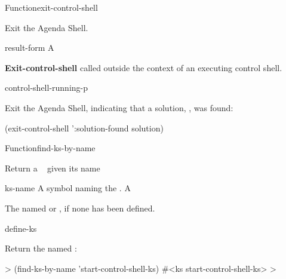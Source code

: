\documentclass[10pt,twoside,english,pdftex]{article}
\begin{document}
\begin{functiondoc}{Function}{exit-control-shell}%
  {}
%
%
%
%

\fnsyntax

\fnpurpose Exit the Agenda Shell.

\fnpackage {}

\fnmodule {}

\fnargs
\begin{args}{result-form}
 A 
\end{args}

\fnerrors \textbf{Exit-control-shell} called outside the context of an
executing control shell.

\begin{alsos}{control-shell-running-p}
\end{alsos}

\fnexample Exit the Agenda Shell, indicating that a solution, 
, was found:
%
\W\supp
\begin{example}
  (exit-control-shell ':solution-found solution)
\end{example}

\end{functiondoc}

 
\begin{functiondoc}{Function}{find-ks-by-name}{ 
    }
%

\fnsyntax

\fnpurpose Return a ~  given its name

\fnpackage {}

\fnmodule {}

\fnargs
\begin{args}{ks-name}
\arg[ks-name] A symbol naming the .
\arg[ks] A 
\end{args}

\fnreturns The   named 
or \nil, if none has been defined.

\begin{alsos}{define-ks}
\also[define-ks]
\also[ks]
\end{alsos}

\fnexample Return the  named :
%
\W\supp
\begin{example}
  > (find-ks-by-name 'start-control-shell-ks)
  #<ks start-control-shell-ks>
  >
\end{example}

\end{functiondoc}
\end{document}
